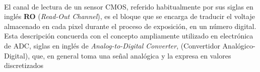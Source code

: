 \paragraph{}
El canal de lectura de un sensor CMOS, referido habitualmente por sus
siglas en inglés \textbf{RO} (\textit{Read-Out Channel}), es el bloque que se
encarga de traducir el voltaje almacenado en cada pixel durante el proceso
de exposición, en un número digital. Esta descripción concuerda con el concepto
ampliamente utilizado en electrónica de ADC, siglas en inglés de \textit{Analog-to-Digital
Converter}, (Convertidor Analógico-Digital), que, en general toma una señal
analógica y la expresa en valores discretizados

